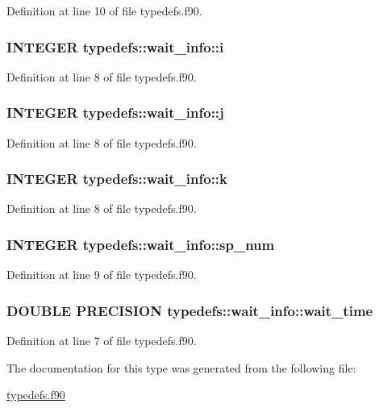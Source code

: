 Definition at line 10 of file typedefs.f90.\hypertarget{typetypedefs_1_1wait__info_a441f92d29ec79adae0f71f538b1b6f74}{
\subsubsection[{i}]{\setlength{\rightskip}{0pt plus 5cm}INTEGER {\bf typedefs::wait\_\-info::i}}}
\label{typetypedefs_1_1wait__info_a441f92d29ec79adae0f71f538b1b6f74}


Definition at line 8 of file typedefs.f90.\hypertarget{typetypedefs_1_1wait__info_a1752c3e6528ab490fea5c4b0928fb484}{
\subsubsection[{j}]{\setlength{\rightskip}{0pt plus 5cm}INTEGER {\bf typedefs::wait\_\-info::j}}}
\label{typetypedefs_1_1wait__info_a1752c3e6528ab490fea5c4b0928fb484}


Definition at line 8 of file typedefs.f90.\hypertarget{typetypedefs_1_1wait__info_a7b76d574e1f61f0167fcc70af7779329}{
\subsubsection[{k}]{\setlength{\rightskip}{0pt plus 5cm}INTEGER {\bf typedefs::wait\_\-info::k}}}
\label{typetypedefs_1_1wait__info_a7b76d574e1f61f0167fcc70af7779329}


Definition at line 8 of file typedefs.f90.\hypertarget{typetypedefs_1_1wait__info_a9b6ff019fc78e04005e2dde1b603eecb}{
\subsubsection[{sp\_\-num}]{\setlength{\rightskip}{0pt plus 5cm}INTEGER {\bf typedefs::wait\_\-info::sp\_\-num}}}
\label{typetypedefs_1_1wait__info_a9b6ff019fc78e04005e2dde1b603eecb}


Definition at line 9 of file typedefs.f90.\hypertarget{typetypedefs_1_1wait__info_acdcf8580da31a315f32ffffad73bd9be}{
\subsubsection[{wait\_\-time}]{\setlength{\rightskip}{0pt plus 5cm}DOUBLE PRECISION {\bf typedefs::wait\_\-info::wait\_\-time}}}
\label{typetypedefs_1_1wait__info_acdcf8580da31a315f32ffffad73bd9be}


Definition at line 7 of file typedefs.f90.

The documentation for this type was generated from the following file:\begin{DoxyCompactItemize}
\item 
\hyperlink{typedefs_8f90}{typedefs.f90}\end{DoxyCompactItemize}
